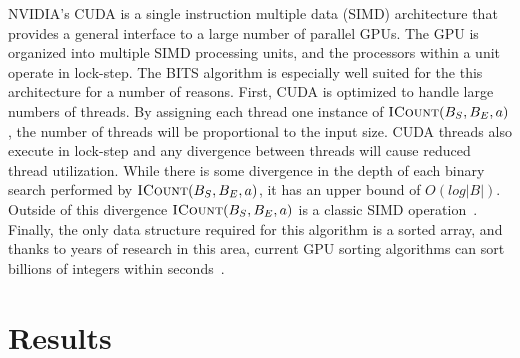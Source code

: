 \documentclass{bioinfo}
\begin{document}

NVIDIA's CUDA is a single instruction multiple data (SIMD) architecture that
provides a general interface to a large number of parallel GPUs.  The GPU is
organized into multiple SIMD processing units, and the processors within a unit
operate in lock-step.  The BITS
algorithm is especially well suited for the this 
architecture for a number of reasons.  First, CUDA is optimized to handle large 
numbers of threads. By assigning each thread one instance of 
$\textsc{ICount}(B_S,B_E,a)$, the number of threads will be proportional to the 
input size.  CUDA threads also execute in lock-step and any divergence between 
threads will cause reduced thread utilization.  While there is some divergence
in the depth of each binary search performed by $\textsc{ICount}(B_S,B_E,a)$, it
has an upper bound of $O(log |B|)$.  Outside of this divergence
$\textsc{ICount}(B_S,B_E,a)$ is a classic SIMD operation~\citep{kirk2010}.
Finally, the only data structure required for this algorithm is a sorted array, 
and thanks to years of research in this area, current GPU sorting algorithms can 
sort billions of integers within seconds~\citep{merrill2011,satish2009}.

\section{Results}

\end{document}
